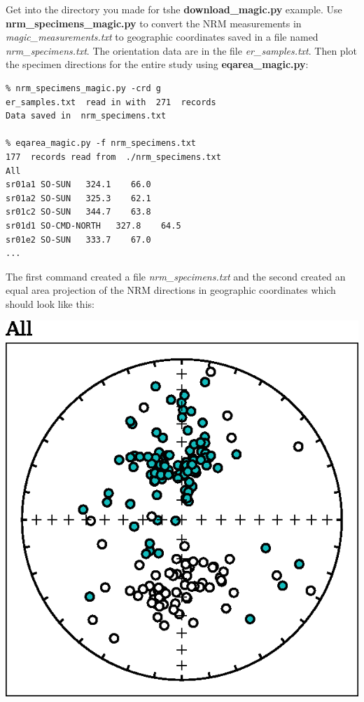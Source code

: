 \documentclass[11pt]{book}
\begin{document}
{{Get into the directory you made for tshe {\bf download\_magic.py} example.   \newline Use {\bf nrm\_specimens\_magic.py} to convert the NRM measurements in  {\it magic\_measurements.txt }   to geographic coordinates saved in a file named {\it nrm\_specimens.txt}.  The orientation data are in the file {\it er\_samples.txt}.    Then plot the specimen directions for the entire study using {\bf eqarea\_magic.py}:


 \begin{verbatim}
% nrm_specimens_magic.py -crd g
er_samples.txt  read in with  271  records
Data saved in  nrm_specimens.txt

% eqarea_magic.py -f nrm_specimens.txt
177  records read from  ./nrm_specimens.txt
All
sr01a1 SO-SUN   324.1    66.0
sr01a2 SO-SUN   325.3    62.1
sr01c2 SO-SUN   344.7    63.8
sr01d1 SO-CMD-NORTH   327.8    64.5
sr01e2 SO-SUN   333.7    67.0
...

 \end{verbatim}

 The first command created a file {\it nrm\_specimens.txt} and the second created an equal area projection of the NRM directions in geographic coordinates which should look like this:

\includegraphics[width=12 cm]{EPSfiles/nrm-eq.eps}
%


}}
\end{document}
